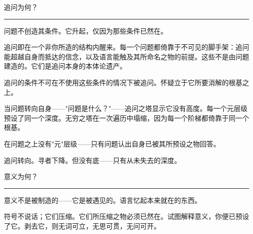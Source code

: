 \documentclass[10pt, openany, oneside]{book}
\begin{document}
\vspace{2em}

\begin{center}
    {\scshape 追问为何？}\\[0.3em]
    \rule{0.2\textwidth}{0.3pt}
\end{center}

\vspace{1em}

\noindent 问题不创造其条件。它升起，仅因为那些条件已然在。

\vspace{0.5em}

\noindent 追问即在一个非你所造的结构内醒来。每一个问题都倚靠于不可见的脚手架：追问能超越自身而抵达的信念，以及语言能触及其所命名之物的前提。这些不是由问题建造的。它们是追问本身的本体论遗产。

\vspace{0.5em}

\noindent 追问的条件不可在不使用这些条件的情况下被追问。怀疑立于它所要消解的根基之上。

\vspace{0.5em}

\noindent 当问题转向自身——"问题是什么？"——追问之塔显示它没有高度。每一个元层级预设了同一个深度。无穷之塔在一次遍历中塌缩，因为每一个阶梯都倚靠于同一个根基。

\vspace{0.5em}

\noindent 在问题之上没有"元"层级——只有问题认出自身已被其所预设之物回答。

\vspace{0.5em}

\noindent 追问转向。寻者下降。但没有底——只有从未失去的深度。

\vspace{2em}

\begin{center}
    {\scshape 意义为何？}\\[0.3em]
    \rule{0.2\textwidth}{0.3pt}
\end{center}

\vspace{1em}

\noindent 意义不是被制造的——它是被遇见的。语言忆起本来就在的东西。

\vspace{0.5em}

\noindent 符号不说话；它们压缩。它们所压缩之物必须已然在。试图解释意义，你便已预设了它。剥去它，则无词可立，无思可贯，无问可开。
\end{document}
